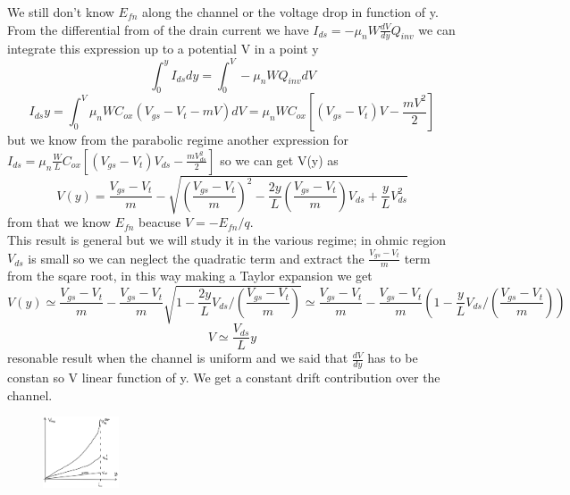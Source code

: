 We still don't know $E_{fn}$ along the channel or the voltage drop in function of y.\\
From the differential from of the drain current we have $I_{ds}=-\mu_nW \frac{dV}{dy}Q_{inv}$ we can integrate this expression up to a potential V in a point y
\begin{equation}
\int_0^yI_{ds}dy=\int^V_0-\mu_nWQ_{inv}dV
\end{equation}
\begin{equation}
I_{ds}y=\int^V_0\mu_nWC_{ox}(V_{gs}-V_t-mV)dV=\mu_nWC_{ox}[(V_{gs}-V_{t})V-\frac{mV^2}{2}]
\end{equation}
but we know from the parabolic regime another expression for $I_{ds}=\mu_n \frac{W}{L}C_{ox}[(V_{gs}-V_{t})V_{ds}-\frac{mV_{ds}^2}{2}]$ so we can get V(y) as
\begin{equation}
V(y)=\frac{V_{gs}-V_{t}}{m}-\sqrt{\left(\frac{V_{gs}-V_{t}}{m}\right)^2-\frac{2y}{L}\left(\frac{V_{gs}-V_{t}}{m}\right)V_{ds}+\frac{y}{L}V_{ds}^2}
\end{equation}
from that we know $E_{fn}$ beacuse $V=-E_{fn}/q$.\\
This result is general but we will study it in the various regime; in ohmic region $V_{ds}$ is small so we can neglect the quadratic term and extract the $\frac{V_{gs}-V_{t}}{m}$ term from the sqare root, in this way making a Taylor expansion we get
\begin{equation}
V(y)\simeq\frac{V_{gs}-V_{t}}{m}-\frac{V_{gs}-V_{t}}{m}\sqrt{1-\frac{2y}{L}V_{ds}/\left(\frac{V_{gs}-V_{t}}{m}\right)}\simeq \frac{V_{gs}-V_{t}}{m}-\frac{V_{gs}-V_{t}}{m}\left(1-\frac{y}{L}V_{ds}/\left(\frac{V_{gs}-V_{t}}{m}\right)\right)
\end{equation}
\begin{equation}
V\simeq \frac{V_{ds}}{L}y
\end{equation}
resonable result when the channel is uniform and we said that $\frac{dV}{dy}$ has to be constan so V linear function of y. We get a constant drift contribution over the channel.\\

\begin{figure}
\includegraphics[width=0.2\textwidth]{g1.png}
\end{figure}


